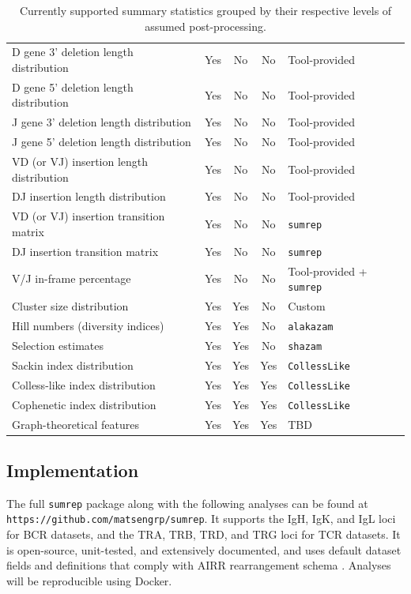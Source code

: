 \documentclass{article}
\begin{document}
\begin{table}
{\begin{tabular}{l|c|c|c|l}
D gene 3' deletion length distribution & Yes & No & No & Tool-provided \\
D gene 5' deletion length distribution & Yes & No & No & Tool-provided \\
J gene 3' deletion length distribution & Yes & No & No & Tool-provided \\
J gene 5' deletion length distribution & Yes & No & No & Tool-provided \\
VD (or VJ) insertion length distribution & Yes & No & No & Tool-provided \\
DJ insertion length distribution & Yes & No & No & Tool-provided \\
VD (or VJ) insertion transition matrix & Yes & No & No & \texttt{sumrep} \\
DJ insertion transition matrix & Yes & No & No & \texttt{sumrep} \\
V/J in-frame percentage & Yes & No & No & Tool-provided + \texttt{sumrep} \\
\hline
Cluster size distribution & Yes & Yes & No & Custom \\
Hill numbers (diversity indices) & Yes & Yes & No & \texttt{alakazam} \\
Selection estimates & Yes & Yes & No & \texttt{shazam} \\
\hline
    Sackin index distribution & Yes & Yes & Yes & \texttt{CollessLike} \cite{Mir2018-lk} \\
Colless-like index distribution & Yes & Yes & Yes & \texttt{CollessLike} \\
Cophenetic index distribution & Yes & Yes & Yes & \texttt{CollessLike} \\
Graph-theoretical features & Yes & Yes & Yes & TBD \\
\end{tabular}
}
\caption{Currently supported summary statistics grouped by their respective levels of assumed post-processing.}
\label{tab:SummaryStatistics}
\end{table}

\subsection*{Implementation}
The full \texttt{sumrep} package along with the following analyses can be found at \texttt{https://github.com/matsengrp/sumrep}.
It supports the IgH, IgK, and IgL loci for BCR datasets, and the TRA, TRB, TRD, and TRG loci for TCR datasets.
It is open-source, unit-tested, and extensively documented, and uses default dataset fields and definitions that comply with AIRR rearrangement schema \cite{Vander_Heiden2018-mu}.
Analyses will be reproducible using Docker.
\end{document}
